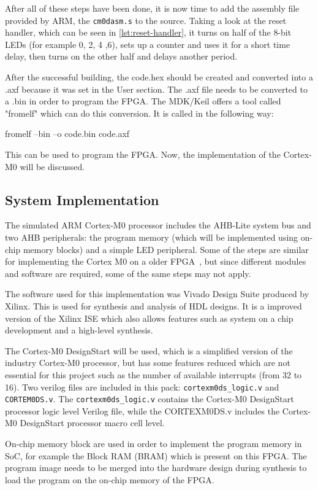 After all of these steps have been done, it is now time to add the assembly file provided by ARM, the \verb|cm0dasm.s| to the source. Taking a look at the reset handler, which can be seen in \ref{lst:reset-handler}, it turns on half of the 8-bit LEDs (for example 0, 2, 4 ,6), sets up a counter and uses it for a short time delay, then turns on the other half and delays another period.

After the successful building, the code.hex should be created and converted into a .axf because it was set in the User section. The .axf file needs to be converted to a .bin in order to program the FPGA. The MDK/Keil offers a tool called "fromelf" which can do this conversion. It is called in the following way:

fromelf --bin --o code.bin code.axf

This can be used to program the FPGA. Now, the implementation of the Cortex-M0 will be discussed.

\subsection{System Implementation}

The simulated ARM Cortex-M0 processor includes the AHB-Lite system bus and two AHB peripherals: the program memory (which will be implemented using on-chip memory blocks) and a simple LED peripheral. Some of the steps are similar for implementing the Cortex M0 on a older FPGA~\cite{implementationcortexm0onnexys2}, but since different modules and software are required, some of the same steps may not apply.

The software used for this implementation was Vivado Design Suite produced by Xilinx. This is used for synthesis and analysis of HDL designs. It is a improved version of the Xilinx ISE which also allows features such as system on a chip development and a high-level synthesis. 

The Cortex-M0 DesignStart will be used, which is a simplified version of the industry Cortex-M0 processor, but has some features reduced which are not essential for this project such as the number of available interrupts (from 32 to 16). Two verilog files are included in this pack:  \verb|cortexm0ds_logic.v| and \verb|CORTEM0DS.v|. The \verb|cortexm0ds_logic.v| contains the Cortex-M0 DesignStart processor logic level Verilog file, while the CORTEXM0DS.v includes the Cortex-M0 DesignStart processor macro cell level.

On-chip memory block are used in order to implement the program memory in SoC, for example the Block RAM (BRAM) which is present on this FPGA. The program image needs to be merged into the hardware design during synthesis to load the program on the on-chip memory of the FPGA.

